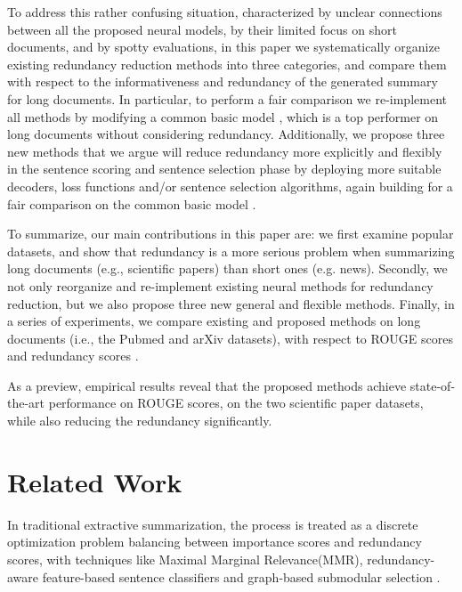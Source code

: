 \documentclass[11pt,a4paper]{article}
\begin{document}
To address this rather confusing situation, characterized by unclear connections between all the proposed neural models, by their limited focus on short documents, and by spotty evaluations,
in this paper we systematically organize existing redundancy reduction methods into three categories, and compare them with respect to the informativeness and redundancy of the generated summary for long documents. In particular, to perform a fair comparison we re-implement all methods by modifying a common basic model \cite{xiao-carenini-2019-extractive}, which is a top performer on long documents without considering redundancy.
Additionally,  we propose three new methods that we argue will reduce  redundancy more explicitly and flexibly in the sentence scoring and sentence selection phase by deploying more suitable decoders, loss functions and/or sentence selection algorithms, again building for a fair comparison on the  common basic model \cite{xiao-carenini-2019-extractive}.









To summarize, our main contributions in this paper are: we first examine popular datasets, and show that redundancy is a more serious problem when summarizing long documents (e.g., scientific papers) than short ones (e.g. news). Secondly, we not only  reorganize and re-implement existing neural methods for redundancy reduction, but we also propose three new general and  flexible methods. Finally, in a series of experiments, we compare existing and proposed methods on long documents (i.e., the Pubmed and arXiv datasets), with respect to ROUGE scores \cite{lin-2004-rouge} and redundancy scores \cite{peyrard-etal-2017-learning, nid_score}.

As a preview, empirical results reveal that the proposed methods achieve state-of-the-art performance on ROUGE scores, on the two scientific paper datasets, while also reducing the redundancy significantly. 


 
\section{Related Work}







In traditional extractive summarization, the process is treated as a discrete optimization problem balancing between importance scores and redundancy scores, with techniques like Maximal Marginal Relevance(MMR)\cite{mmr}, redundancy-aware feature-based sentence classifiers \cite{redundancy_aware} and graph-based submodular selection \cite{Lin2009}. 
\end{document}
